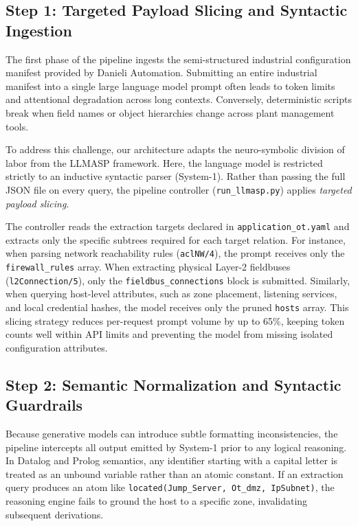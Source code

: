 \documentclass[target=mst,aauheader=aics,style=]{thud}
\begin{document}
\subsection{Step 1: Targeted Payload Slicing and Syntactic Ingestion}
\label{subsec:step1_ingestion}
The first phase of the pipeline ingests the semi-structured industrial configuration manifest provided by Danieli Automation. Submitting an entire industrial manifest into a single large language model prompt often leads to token limits and attentional degradation across long contexts. Conversely, deterministic scripts break when field names or object hierarchies change across plant management tools.

To address this challenge, our architecture adapts the neuro-symbolic division of labor from the LLMASP framework. Here, the language model is restricted strictly to an inductive syntactic parser (System-1). Rather than passing the full JSON file on every query, the pipeline controller (\texttt{run\_llmasp.py}) applies \textit{targeted payload slicing}. 

The controller reads the extraction targets declared in \texttt{application\_ot.yaml} and extracts only the specific subtrees required for each target relation. For instance, when parsing network reachability rules (\texttt{aclNW/4}), the prompt receives only the \texttt{firewall\_rules} array. When extracting physical Layer-2 fieldbuses (\texttt{l2Connection/5}), only the \texttt{fieldbus\_connections} block is submitted. Similarly, when querying host-level attributes, such as zone placement, listening services, and local credential hashes, the model receives only the pruned \texttt{hosts} array. This slicing strategy reduces per-request prompt volume by up to 65\%, keeping token counts well within API limits and preventing the model from missing isolated configuration attributes.

\subsection{Step 2: Semantic Normalization and Syntactic Guardrails}
Because generative models can introduce subtle formatting inconsistencies, the pipeline intercepts all output emitted by System-1 prior to any logical reasoning. In Datalog and Prolog semantics, any identifier starting with a capital letter is treated as an unbound variable rather than an atomic constant. If an extraction query produces an atom like \texttt{located(Jump\_Server, Ot\_dmz, IpSubnet)}, the reasoning engine fails to ground the host to a specific zone, invalidating subsequent derivations.
\end{document}
